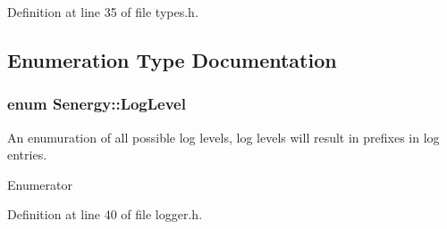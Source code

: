 Definition at line 35 of file types.\-h.



\subsection{Enumeration Type Documentation}
\hypertarget{namespace_senergy_a8a440a300c8ecafb12b81c1853a5c66d}{
\subsubsection[{Log\-Level}]{\setlength{\rightskip}{0pt plus 5cm}enum {\bf Senergy\-::\-Log\-Level}\hspace{0.3cm}{\ttfamily [strong]}}}\label{namespace_senergy_a8a440a300c8ecafb12b81c1853a5c66d}


An enumuration of all possible log levels, log levels will result in prefixes in log entries. 

\begin{Desc}
\item[Enumerator]\par
\begin{description}
\item[{\em 
\hypertarget{namespace_senergy_a8a440a300c8ecafb12b81c1853a5c66da4059b0251f66a18cb56f544728796875}{Info}\label{namespace_senergy_a8a440a300c8ecafb12b81c1853a5c66da4059b0251f66a18cb56f544728796875}
}]\item[{\em 
\hypertarget{namespace_senergy_a8a440a300c8ecafb12b81c1853a5c66da902b0d55fddef6f8d651fe1035b7d4bd}{Error}\label{namespace_senergy_a8a440a300c8ecafb12b81c1853a5c66da902b0d55fddef6f8d651fe1035b7d4bd}
}]\item[{\em 
\hypertarget{namespace_senergy_a8a440a300c8ecafb12b81c1853a5c66da0eaadb4fcb48a0a0ed7bc9868be9fbaa}{Warning}\label{namespace_senergy_a8a440a300c8ecafb12b81c1853a5c66da0eaadb4fcb48a0a0ed7bc9868be9fbaa}
}]\item[{\em 
\hypertarget{namespace_senergy_a8a440a300c8ecafb12b81c1853a5c66daa603905470e2a5b8c13e96b579ef0dba}{Debug}\label{namespace_senergy_a8a440a300c8ecafb12b81c1853a5c66daa603905470e2a5b8c13e96b579ef0dba}
}]\end{description}
\end{Desc}


Definition at line 40 of file logger.\-h.

